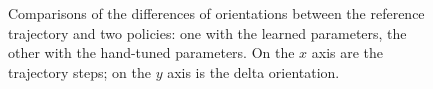 \begin{figure}[H]
\centering
{}
\hspace{1mm}
\hspace{1mm}
\hspace{1mm}
\caption{Comparisons of the differences of orientations between the reference trajectory and two policies: one with the learned parameters, the other with the hand-tuned parameters. On the $x$ axis are the trajectory steps; on the $y$ axis is the delta orientation.}
\label{fig:brakeexpl}
\end{figure}


